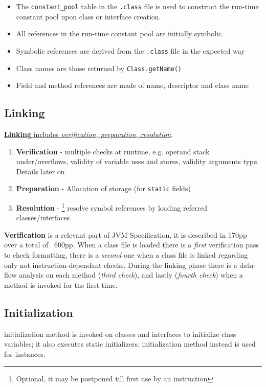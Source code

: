 \begin{itemize}
	\item The \lstinline|constant_pool| table in the \texttt{.class} file is
	      used to construct the run-time constant pool
	      upon class or interface creation.
	\item All references in the run-time constant pool are
	      initially symbolic.
	\item Symbolic references are derived from
	      the \texttt{.class} file in the expected way
	\item Class names are those returned by
	      \lstinline|Class.getName()|
	\item Field and method references are made of name,
	      descriptor and class name
\end{itemize}

\subsection{Linking}
\ul{\textbf{Linking} includes \textit{verification, preparation, resolution}}.
\begin{enumerate}
    \item \textbf{Verification} -  multiple checks at runtime, e.g. operand stack under/overflows, validity of variable uses and stores, validity arguments type.
    Details later on
    \item \textbf{Preparation} -  Allocation of storage (for \texttt{static} fields) 
    \item \textbf{Resolution} - \footnote{Optional, it may be postponed till first use by an instruction} resolve symbol references by loading referred classes/interfaces
\end{enumerate}

\textbf{Verification} is a relevant part of JVM Specification, it is described in 170pp over a total of ~600pp.
When a class file is loaded there is a \textit{first} verification pass to check formatting, 
there is a \textit{second} one when a class file is linked regarding only not instruction-dependant checks.
During the linking phase there is a data-flow analysis on each method (\textit{third check}),
and lastly (\textit{fourth check}) when a method is invoked for the first time.

\subsection{Initialization}
 initialization method is invoked on classes
and interfaces to initialize class variables;
it also executes static initializers.
 initialization method instead is used for instances.


